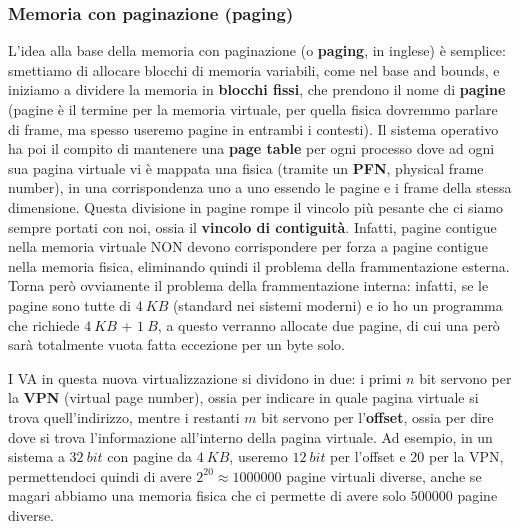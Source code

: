 \documentclass[11pt, a4paper, titlepage, oneside]{scrbook}
\begin{document}
\subsubsection*{Memoria con paginazione (paging)}

L'idea alla base della memoria con paginazione (o \textbf{paging}, in inglese) è semplice: smettiamo di allocare blocchi di memoria variabili, come nel base and bounds, e iniziamo a dividere la memoria in \textbf{blocchi fissi}, che prendono il nome di \textbf{pagine} (\NB pagine è il termine per la memoria virtuale, per quella fisica dovremmo parlare di frame, ma spesso useremo pagine in entrambi i contesti). Il sistema operativo ha poi il compito di mantenere una \textbf{page table} per ogni processo dove ad ogni sua pagina virtuale vi è mappata una fisica (tramite un \textbf{PFN}, physical frame number), in una corrispondenza uno a uno essendo le pagine e i frame della stessa dimensione. Questa divisione in pagine rompe il vincolo più pesante che ci siamo sempre portati con noi, ossia il \textbf{vincolo di contiguità}. Infatti, pagine contigue nella memoria virtuale NON devono corrispondere per forza a pagine contigue nella memoria fisica, eliminando quindi il problema della frammentazione esterna. Torna però ovviamente il problema della frammentazione interna: infatti, se le pagine sono tutte di $\SI{4}{KB}$ (standard nei sistemi moderni) e io ho un programma che richiede $\SI{4}{KB}$ + $\SI{1}{B}$, a questo verranno allocate due pagine, di cui una però sarà totalmente vuota fatta eccezione per un byte solo. 

I VA in questa nuova virtualizzazione si dividono in due: i primi $n$ bit servono per la \textbf{VPN} (virtual page number), ossia per indicare in quale pagina virtuale si trova quell'indirizzo, mentre i restanti $m$ bit servono per l'\textbf{offset}, ossia per dire dove si trova l'informazione all'interno della pagina virtuale. Ad esempio, in un sistema a $\SI{32}{bit}$ con pagine da $\SI{4}{KB}$, useremo $\SI{12}{bit}$ per l'offset e 20 per la VPN, permettendoci quindi di avere $2^{20} \approx 1000000$ pagine virtuali diverse, anche se magari abbiamo una memoria fisica che ci permette di avere solo $500000$ pagine diverse. 
\end{document}
